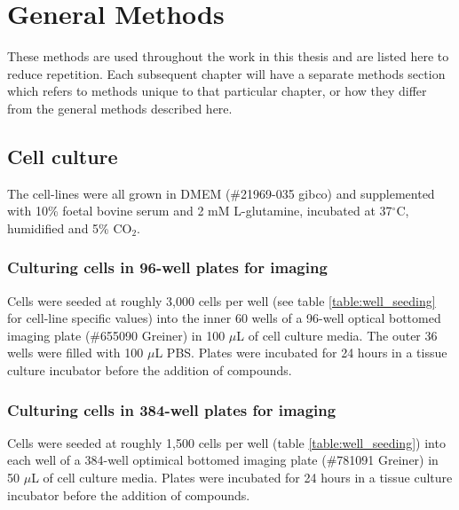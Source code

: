 \documentclass[a4paper,11pt,twoside,openright]{scrbook}
\begin{document}
\chapter{General Methods} \label{chapter:generalMethods}

These methods are used throughout the work in this thesis and are listed here to reduce repetition.
Each subsequent chapter will have a separate methods section which refers to methods unique to that particular chapter, 
or how they differ from the general methods described here.


\section{Cell culture}

The cell-lines were all grown in DMEM (\#21969-035 gibco) and supplemented with 10\% foetal bovine serum and 2 mM 
L-glutamine, incubated at 37$^\circ$C, humidified and 5\% CO$_2$.


\subsection{Culturing cells in 96-well plates for imaging}

Cells were seeded at roughly 3,000 cells per well (see table \ref{table:well_seeding} for cell-line specific values) 
into the inner 60 wells of a 96-well optical bottomed imaging plate (\#655090 Greiner) in 100 $\mu$L of cell culture 
media.
The outer 36 wells were filled with 100 $\mu$L PBS.
Plates were incubated for 24 hours in a tissue culture incubator before the addition of compounds.


\subsection{Culturing cells in 384-well plates for imaging}

Cells were seeded at roughly 1,500 cells per well (table \ref{table:well_seeding}) into each well of a 384-well 
optimical bottomed imaging plate (\#781091 Greiner) in 50 $\mu$L of cell culture media.
Plates were incubated for 24 hours in a tissue culture incubator before the addition of compounds.
\end{document}
